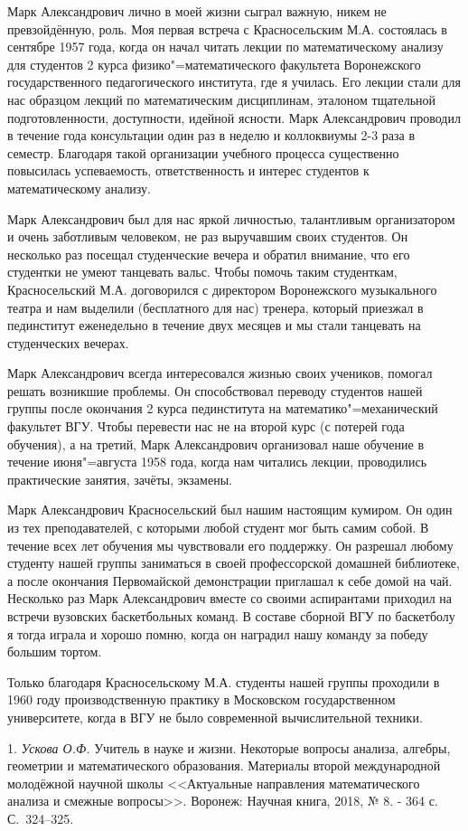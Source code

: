 Марк Александрович лично в моей жизни сыграл важную, никем не превзойдённую, роль. Моя первая встреча с Красносельским М.А.
состоялась в сентябре 1957 года, когда он начал читать лекции по математическому анализу для студентов 2 курса
физико"=математического факультета Воронежского государственного педагогического института, где я училась. Его лекции стали для нас
образцом лекций по математическим дисциплинам, эталоном тщательной подготовленности, доступности, идейной ясности. Марк
Александрович проводил в течение года консультации один раз в неделю и коллоквиумы 2-3 раза в семестр. Благодаря такой
организации учебного процесса существенно повысилась успеваемость, ответственность и интерес студентов к
математическому анализу.

Марк Александрович был для нас яркой личностью, талантливым организатором и очень заботливым человеком, не раз выручавшим
своих студентов. Он несколько раз посещал студенческие вечера и обратил внимание, что его студентки не умеют танцевать
вальс. Чтобы помочь таким студенткам, Красносельский М.А. договорился с директором Воронежского музыкального театра и нам выделили
(бесплатного для нас) тренера, который приезжал в пединститут еженедельно в течение двух месяцев и мы стали танцевать на
студенческих вечерах.

Марк Александрович всегда интересовался жизнью своих учеников, помогал решать возникшие проблемы. Он способствовал
переводу студентов нашей группы после окончания 2 курса пединститута на математико"=механический факультет ВГУ. Чтобы
перевести нас не на второй курс (с потерей года обучения), а на третий, Марк Александрович организовал наше обучение
в течение июня"=августа 1958 года, когда нам читались лекции, проводились практические занятия, зачёты, экзамены.

Марк Александрович Красносельский был нашим настоящим кумиром. Он один из тех преподавателей, с которыми любой студент
мог быть самим собой. В течение всех лет обучения мы чувствовали его поддержку. Он разрешал любому студенту нашей
группы заниматься в своей профессорской домашней библиотеке, а после окончания Первомайской демонстрации приглашал
к себе домой на чай. Несколько раз Марк Александрович вместе со своими аспирантами приходил на встречи вузовских
баскетбольных команд. В составе сборной ВГУ по баскетболу я тогда играла и хорошо помню, когда он наградил нашу
команду за победу большим тортом.

Только благодаря Красносельскому М.А. студенты нашей группы проходили в 1960 году производственную практику в Московском
государственном университете, когда в ВГУ не было современной вычислительной техники.


\litlist

1. {\it Ускова О.Ф.} Учитель в науке и жизни. Некоторые вопросы анализа, алгебры, геометрии и математического образования.
Материалы второй международной молодёжной научной школы <<Актуальные направления математического анализа и смежные вопросы>>.
Воронеж: Научная книга, 2018, № 8. - 364 с. С.~324--325.
